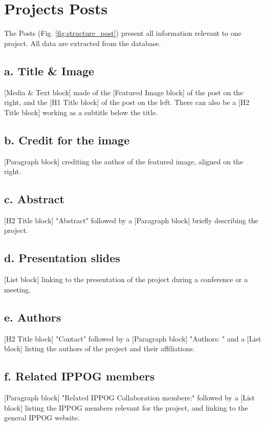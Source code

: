 \section{Projects Posts}\label{sec:structure_post}

The Posts (Fig. \ref{fig:structure_post}) present all information relevant to one project. All data are extracted from the database.

\subsection*{a. Title \& Image}
[Media \& Text block] made of the [Featured Image block] of the post on the right, and the [H1 Title block] of the post on the left. There can also be a [H2 Title block] working as a subtitle below the title.

\subsection*{b. Credit for the image}
[Paragraph block] crediting the author of the featured image, aligned on the right.

\subsection*{c. Abstract}
[H2 Title block] "Abstract" followed by a [Paragraph block] briefly describing the project.

\subsection*{d. Presentation slides}
[List block] linking to the presentation of the project during a conference or a meeting.

\subsection*{e. Authors}
[H2 Title block] "Contact" followed by a [Paragraph block] "Authors: " and a [List block] listing the authors of the project and their affiliations.

\subsection*{f. Related IPPOG members}
[Paragraph block] "Related IPPOG Collaboration members:" followed by a [List block] listing the IPPOG members relevant for the project, and linking to the general IPPOG website.

